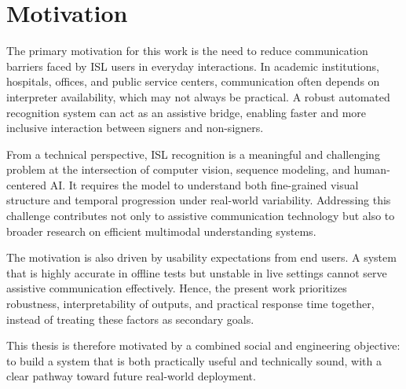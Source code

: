 \section{Motivation}
The primary motivation for this work is the need to reduce communication barriers faced by ISL users in everyday interactions. In academic institutions, hospitals, offices, and public service centers, communication often depends on interpreter availability, which may not always be practical. A robust automated recognition system can act as an assistive bridge, enabling faster and more inclusive interaction between signers and non-signers.

From a technical perspective, ISL recognition is a meaningful and challenging problem at the intersection of computer vision, sequence modeling, and human-centered AI. It requires the model to understand both fine-grained visual structure and temporal progression under real-world variability. Addressing this challenge contributes not only to assistive communication technology but also to broader research on efficient multimodal understanding systems.

The motivation is also driven by usability expectations from end users. A system that is highly accurate in offline tests but unstable in live settings cannot serve assistive communication effectively. Hence, the present work prioritizes robustness, interpretability of outputs, and practical response time together, instead of treating these factors as secondary goals.

This thesis is therefore motivated by a combined social and engineering objective: to build a system that is both practically useful and technically sound, with a clear pathway toward future real-world deployment.
